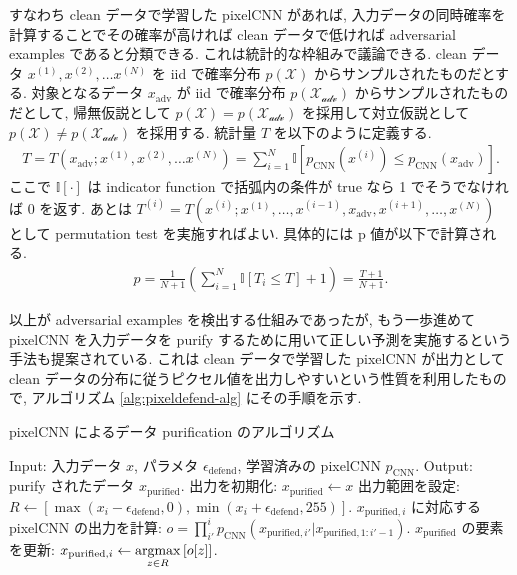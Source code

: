 すなわち clean データで学習した pixelCNN があれば, 入力データの同時確率を計算することでその確率が高ければ clean データで低ければ adversarial examples であると分類できる.
これは統計的な枠組みで議論できる.
clean データ $x^{(1)}, x^{(2)}, \dots x^{(N)}$ を iid で確率分布 $p (\mathcal{X})$ からサンプルされたものだとする.
対象となるデータ $x_{\text{adv}}$ が iid で確率分布 $p (\mathcal{X_{\text{adv}}})$ からサンプルされたものだとして, 帰無仮説として $p (\mathcal{X}) = p (\mathcal{X_{\text{adv}}})$ を採用して対立仮説として $p (\mathcal{X}) \neq p (\mathcal{X_{\text{adv}}})$ を採用する.
統計量 $T$ を以下のように定義する.
%
\begin{eqnarray}
T = T(x_{\text{adv}}; x^{(1)}, x^{(2)}, \dots x^{(N)}) = \sum_{i=1}^{N} \mathbb{I} \left[ p_{\text{CNN}} (x^{(i)}) \leq p_{\text{CNN}} (x_{\text{adv}}) \right].
\label{eq:pixel-defend-pixelcnn-test-stat}
\end{eqnarray}
%
ここで $\mathbb{I} [\cdot]$ は indicator function で括弧内の条件が true なら 1 でそうでなければ 0 を返す.
あとは $T^{(i)} = T(x^{(i)}; x^{(1)}, \dots, x^{(i-1)}, x_{\text{adv}}, x^{(i+1)}, \dots, x^{(N)})$ として permutation test を実施すればよい.
具体的には p 値が以下で計算される.
%
\begin{eqnarray}
p = \frac{1}{N + 1} \left( \sum_{i=1}^{N} \mathbb{I} [T_i \leq T] + 1 \right) = \frac{T + 1}{N + 1}.
\label{eq:pixel-defend-pixelcnn-test-pvalue}
\end{eqnarray}
%

以上が adversarial examples を検出する仕組みであったが, もう一歩進めて pixelCNN を入力データを purify するために用いて正しい予測を実施するという手法も提案されている.
これは clean データで学習した pixelCNN が出力として clean データの分布に従うピクセル値を出力しやすいという性質を利用したもので, アルゴリズム \ref{alg:pixeldefend-alg} にその手順を示す.
%
\begin{algorithm}
\caption{pixelCNN によるデータ purification のアルゴリズム}
\label{alg:pixeldefend-alg}
\begin{algorithmic}[1]
    \State Input: 入力データ $x$, パラメタ $\epsilon_{\text{defend}}$, 学習済みの pixelCNN $p_{\text{CNN}}$.
    \State Output: purify されたデータ $x_{\text{purified}}$.
	\State 出力を初期化: $x_{\text{purified}} \leftarrow x$
	\State 出力範囲を設定: $R \leftarrow \left[ \max (x_i - \epsilon_{\text{defend}}, 0), \min (x_i + \epsilon_{\text{defend}}, 255) \right]$.
	\State $x_{\text{purified}, i}$ に対応する pixelCNN の出力を計算: $o = \prod_{i'}^i p_{\text{CNN}} (x_{\text{purified}, i'} | x_{\text{purified}, 1:i' - 1})$.
	\State $x_{\text{purified}}$ の要素を更新: $x_{\text{purified}, i} \leftarrow \mathop{\rm argmax}\limits_{z \in R} \left[ o[z] \right]$.
    \EndFor
\end{algorithmic} 
\end{algorithm}
%

